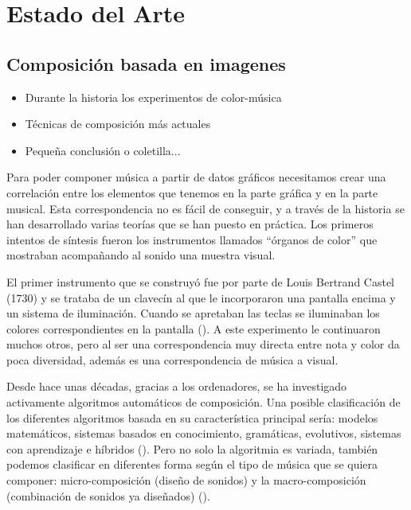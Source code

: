 \section{Estado del Arte}
\label{sec:estadodelarte}



\subsection{Composición basada en imagenes}


\begin{itemize}
\item Durante la historia los experimentos de color-música
\item Técnicas de composición más actuales
\item Pequeña conclusión o coletilla...
\end{itemize}

Para poder componer música a partir de datos gráficos necesitamos crear una correlación entre los elementos que tenemos en la parte gráfica y en la parte musical. Esta correspondencia no es fácil de conseguir, y a través de la historia se han desarrollado varias teorías que se han puesto en práctica. Los primeros intentos de síntesis fueron los instrumentos llamados ``órganos de color'' que mostraban acompañando al sonido una muestra visual.

El primer instrumento que se construyó fue por parte de Louis Bertrand Castel (1730) y se trataba de un clavecín al que le incorporaron una pantalla encima y un sistema de iluminación. Cuando se apretaban las teclas se iluminaban los colores correspondientes en la pantalla (\cite{organosColor}). A este experimento le continuaron muchos otros, pero al ser una correspondencia muy directa entre nota y color da poca diversidad, además es una correspondencia de música a visual.

Desde hace unas décadas, gracias a los ordenadores, se ha investigado activamente algoritmos automáticos de composición. Una posible clasificación de los diferentes algoritmos basada en su característica principal sería: modelos matemáticos, sistemas basados en conocimiento, gramáticas, evolutivos, sistemas con aprendizaje e híbridos (\cite{AIMethodsForComposition}). Pero no solo la algoritmia es variada, también podemos clasificar en diferentes forma según el tipo de música que se quiera componer: micro-composición (diseño de sonidos) y la macro-composición (combinación de sonidos ya diseñados) (\cite{AudioVisualSurvey}).

